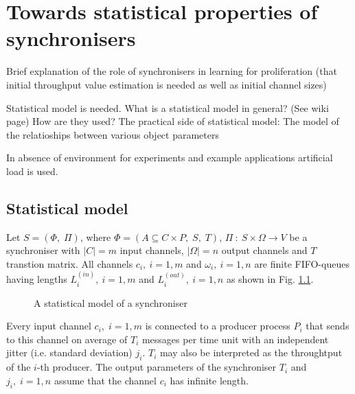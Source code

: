 \chapter{Towards statistical properties of synchronisers}
Brief explanation of the role of synchronisers in learning for proliferation (that initial throughput value estimation is needed as well as initial channel sizes)

Statistical model is needed.
What is a statistical model in general? (See wiki page) How are they used?
The practical side of statistical model: The model of the relatioships between various object parameters
 
In absence of environment for experiments and example applications artificial load is used.


\section{Statistical model}
Let $S = (\Phi, \; \Pi)$, where $\Phi = (A \subseteq C \times P, \; S, \; T)$, $\Pi \: : \: S \times \Omega \to V$ be a synchroniser with $|C| = m$ input channels, $|\Omega| = n$ output channels and $T$ transtion matrix. All channels $c_{i}, \: i = 1,m$ and $\omega_{i}, \: i=1,n$ are finite FIFO-queues having lengths $L^{(in)}_{i}, \: i = 1,m$ and $L^{(out)}_{i}, \: i=1,n$ as shown in Fig. \ref{fig:stat_mod}.

  \begin{figure}[h] %
  \scalebox{0.8}{
    
  }
  \caption{A statistical model of a synchroniser}
  \label{fig:stat_mod}
  \end{figure}

Every input channel $c_{i}, \; i = 1,m$ is connected to a producer process $P_{i}$ that sends to this channel on average of $T_{i}$ messages per time unit with an independent jitter (i.e. standard deviation) $j_{i}$. $T_{i}$ may also be interpreted as the throughtput of the $i$-th producer. The output parameters of the synchroniser $T_{i}$ and $j_{i}, \; i=1,n$ assume that the channel $c_{i}$ has infinite length.

